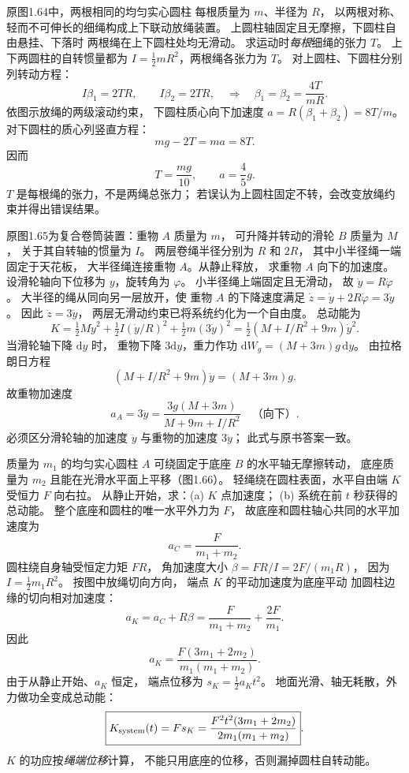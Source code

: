 原图1.64中，两根相同的均匀实心圆柱
每根质量为 $m$、半径为 $R$，
以两根对称、轻而不可伸长的细绳构成上下联动放绳装置。
上圆柱轴固定且无摩擦，下圆柱自由悬挂、下落时
两根绳在上下圆柱处均无滑动。
求运动时\emph{每根}细绳的张力 $T$。
\exsolution
上下两圆柱的自转惯量都为
$I=\frac12mR^2$，两根绳各张力为 $T$。
对上圆柱、下圆柱分别列转动方程：
\[
I\beta_1=2TR,\qquad I\beta_2=2TR,
\quad\Longrightarrow\quad
\beta_1=\beta_2=\frac{4T}{mR}.
\]
依图示放绳的两级滚动约束，
下圆柱质心向下加速度
$a=R(\beta_1+\beta_2)=8T/m$。
对下圆柱的质心列竖直方程：
\[
mg-2T=ma=8T.
\]
因而
\[
\boxed{T=\frac{mg}{10}},
\qquad
\boxed{a=\frac45g}.
\]
\excheck $T$ 是每根绳的张力，不是两绳总张力；
若误认为上圆柱固定不转，会改变放绳约束并得出错误结果。

原图1.65为复合卷筒装置：重物 $A$ 质量为 $m$，
可升降并转动的滑轮 $B$ 质量为 $M$，
关于其自转轴的惯量为 $I$。
两层卷绳半径分别为 $R$ 和 $2R$，
其中小半径绳一端固定于天花板，
大半径绳连接重物 $A$。从静止释放，
求重物 $A$ 向下的加速度。
\exsolution
设滑轮轴向下位移为 $y$，旋转角为 $\varphi$。
小半径绳上端固定且无滑动，
故 $\dot y=R\dot\varphi$。
大半径的绳从同向另一层放开，使
重物 $A$ 的下降速度满足
$\dot z=\dot y+2R\dot\varphi=3\dot y$。
因此 $\ddot z=3\ddot y$，
两层无滑动约束已将系统约化为一个自由度。
总动能为
\[
K=\tfrac12M\dot y^2+
\tfrac12I(\dot y/R)^2+
\tfrac12m(3\dot y)^2
=\tfrac12(M+I/R^2+9m)\dot y^2.
\]
当滑轮轴下降 $\mathrm dy$ 时，
重物下降 $3\mathrm dy$，重力作功
$\mathrm dW_g=(M+3m)g\,\mathrm dy$。
由拉格朗日方程
\[
(M+I/R^2+9m)\ddot y=(M+3m)g.
\]
故重物加速度
\[
\boxed{a_A=3\ddot y
=\frac{3g(M+3m)}{M+9m+I/R^2}}
\quad\text{（向下）}.
\]
\excheck 必须区分滑轮轴的加速度 $\ddot y$
与重物的加速度 $3\ddot y$；
此式与原书答案一致。

质量为 $m_1$ 的均匀实心圆柱 $A$
可绕固定于底座 $B$ 的水平轴无摩擦转动，
底座质量为 $m_2$ 且能在光滑水平面上平移（图1.66）。
轻绳绕在圆柱表面，水平自由端 $K$ 受恒力 $F$ 向右拉。
从静止开始，求：(a) $K$ 点加速度；
(b) 系统在前 $t$ 秒获得的总动能。
\exsolution
整个底座和圆柱的唯一水平外力为 $F$，
故底座和圆柱轴心共同的水平加速度为
\[
a_C=\frac{F}{m_1+m_2}.
\]
圆柱绕自身轴受恒定力矩 $FR$，
角加速度大小
$\beta=FR/I=2F/(m_1R)$，
因为 $I=\frac12m_1R^2$。
按图中放绳切向方向，
端点 $K$ 的平动加速度为底座平动
加圆柱边缘的切向相对加速度：
\[
a_K=a_C+R\beta
=\frac F{m_1+m_2}+\frac{2F}{m_1}.
\]
因此
\[
\boxed{a_K=\frac{F(3m_1+2m_2)}{m_1(m_1+m_2)}}.
\]
由于从静止开始、$a_K$ 恒定，
端点位移为 $s_K=\frac12a_Kt^2$。
地面光滑、轴无耗散，外力做功全变成总动能：
\[
\boxed{K_{\rm system}(t)=Fs_K
=\frac{F^2t^2(3m_1+2m_2)}
{2m_1(m_1+m_2)}}.
\]
\excheck $K$ 的功应按\emph{绳端位移}计算，
不能只用底座的位移，否则漏掉圆柱自转动能。

